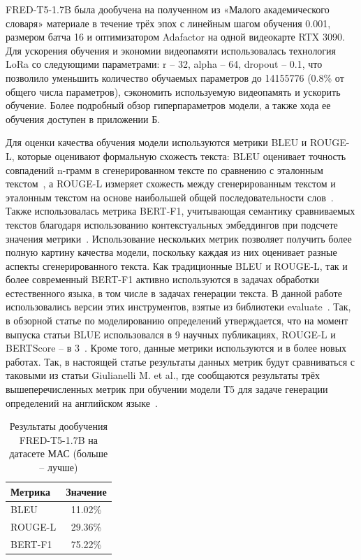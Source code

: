 \documentclass[LI,VKR]{HSEUniversity}
\begin{document}
FRED-T5-1.7B была дообучена на полученном из «Малого академического словаря» материале
в течение трёх эпох с линейным шагом обучения 0.001,
размером батча 16 и оптимизатором Adafactor на одной видеокарте RTX 3090.
Для ускорения обучения и экономии видеопамяти использовалась технология LoRa со
следующими параметрами: r – 32, alpha – 64, dropout – 0.1, что позволило
уменьшить количество обучаемых параметров до 14155776 (0.8\% от общего числа параметров),
сэкономить используемую видеопамять и ускорить обучение.
Более подробный обзор гиперпараметров модели, а также хода ее обучения доступен в приложении Б.

Для оценки качества обучения модели используются метрики BLEU и ROUGE-L,
которые оценивают формальную схожесть текста: BLEU оценивает точность совпадений n-грамм
в сгенерированном тексте по сравнению с эталонным текстом~\cite{BLUE}, а ROUGE-L измеряет схожесть между
сгенерированным текстом и эталонным текстом на основе наибольшей общей последовательности слов~\cite{ROUGE}.
Также использовалась метрика BERT-F1, учитывающая семантику сравниваемых текстов благодаря
использованию контекстуальных эмбеддингов при подсчете значения метрики~\cite{BERTScore}.
Использование нескольких метрик позволяет получить более полную картину качества модели,
поскольку каждая из них оценивает разные аспекты сгенерированного текста.
Как традиционные BLEU и ROUGE-L, так и более современный BERT-F1 активно используются в
задачах обработки естественного языка, в том числе в задачах генерации текста.
В данной работе использовались версии этих инструментов, взятые из библиотеки evaluate~\cite{Evaluate}.
Так, в обзорной статье по моделированию определений утверждается, что на момент выпуска статьи BLUE
использовался в 9 научных публикациях, ROUGE-L и BERTScore – в 3~\cite{DefinitionModelingReviewAndDatasetAnalysis}.
Кроме того, данные метрики используются и в более новых работах.
Так, в настоящей статье результаты данных метрик будут сравниваться с таковыми из статьи
Giulianelli M. et al., где сообщаются результаты трёх вышеперечисленных метрик при обучении модели
Т5 для задаче генерации определений на английском языке~\cite{DefinitionGenerationMainArticle}.

\begin{table}[H]
\centering
\caption{Результаты дообучения FRED-T5-1.7B на датасете МАС (больше – лучше)}
\begin{tabular}{lc}
\hline
Метрика                  & Значение \\
\hline
BLEU            & 11.02\%                  \\
ROUGE-L           & 29.36\%                  \\
BERT-F1          & 75.22\%                  \\
\hline
\end{tabular}
\end{table}
\end{document}
